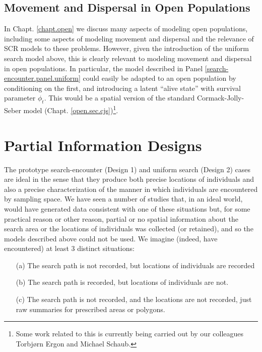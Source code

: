 \subsection{Movement and Dispersal in Open Populations}

In Chapt. \ref{chapt.open} we discuss many aspects of modeling open
populations, including some aspects of modeling movement and dispersal
and the relevance of SCR models to these problems. However, given the
introduction of the uniform search model above, this is clearly
relevant to modeling movement and dispersal in open populations.  In
particular, the model described in Panel
\ref{search-encounter.panel.uniform} could easily be adapted to an
open population by conditioning on the first, and introducing a latent
``alive state'' with survival parameter $\phi_{t}$. This would be a
spatial version of the standard Cormack-Jolly-Seber model
(Chapt. \ref{open.sec.cjs})\footnote{Some work related to this is
  currently being carried out by our colleagues Torbj{\o}rn Ergon and
  Michael Schaub.}.


\section{Partial Information Designs}

The prototype search-encounter (Design 1) and uniform search (Design
2) cases are ideal in the sense that they produce both precise
locations of individuals and also a precise characterization of the
manner in which individuals are encountered by sampling space.  We
have seen a number of studies that, in an ideal world, would have
generated data consistent with one of these situations but, for some
practical reason or other reason, partial or no spatial information
about the search area or the locations of individuals was collected
(or retained), and so the models described above could not be used.
We imagine (indeed, have encountered) at least 3 distinct situations:

\begin{itemize}
\item[(a)] The search path is not recorded, but locations  of
  individuals are recorded
\item[(b)] The search path is recorded, but locations of individuals
  are not.
\item[(c)] The search path is not recorded, and the locations are not
  recorded, just raw summaries for prescribed areas or polygons.
\end{itemize}

